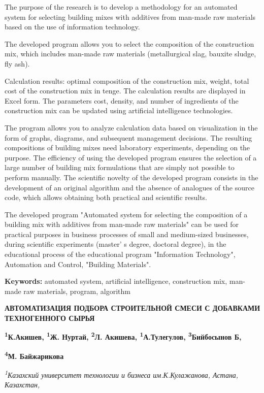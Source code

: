 {The purpose of the research is to develop a methodology for an automated
system for selecting building mixes with additives from man-made raw
materials based on the use of information technology.

The developed program allows you to select the composition of the
construction mix, which includes man-made raw materials (metallurgical
slag, bauxite sludge, fly ash).

Calculation results: optimal composition of the construction mix,
weight, total cost of the construction mix in tenge. The calculation
results are displayed in Excel form. The parameters cost, density, and
number of ingredients of the construction mix can be updated using
artificial intelligence technologies.

The program allows you to analyze calculation data based on
visualization in the form of graphs, diagrams, and subsequent management
decisions. The resulting compositions of building mixes need laboratory
experiments, depending on the purpose. The efficiency of using the
developed program ensures the selection of a large number of building
mix formulations that are simply not possible to perform manually. The
scientific novelty of the developed program consists in the development
of an original algorithm and the absence of analogues of the source
code, which allows obtaining both practical and scientific results.

The developed program "Automated system for selecting the composition of
a building mix with additives from man-made raw materials" can be used
for practical purposes in business processes of small and medium-sized
businesses, during scientific experiments (master' s
degree, doctoral degree), in the educational process of the educational
program "Information Technology", Automation and Control, "Building
Materials".

{\bfseries Keywords:} automated system, artificial intelligence,
construction mix, man-made raw materials, program, algorithm

{\bfseries АВТОМАТИЗАЦИЯ ПОДБОРА СТРОИТЕЛЬНОЙ СМЕСИ С ДОБАВКАМИ
ТЕХНОГЕННОГО СЫРЬЯ}

{\bfseries \textsuperscript{1}К.Акишев\textsuperscript{\envelope },
\textsuperscript{1}Ж. Нуртай, \textsuperscript{2}Л. Акишева,
\textsuperscript{1}А.Тулегулов, \textsuperscript{3}Бийбосынов Б,}

{\bfseries \textsuperscript{4}М. Байжарикова}

\emph{\textsuperscript{1}Казахский университет технологии и бизнеса
им.К.Кулажанова, Астана, Казахстан,}

}
